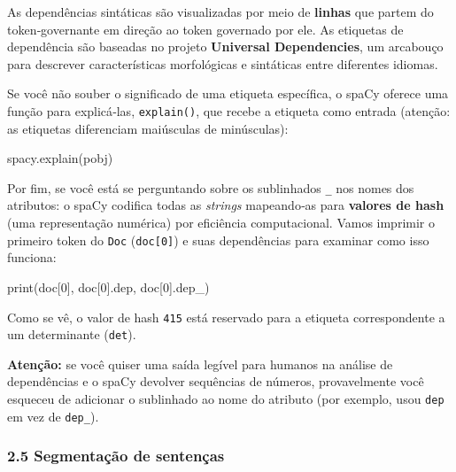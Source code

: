 \documentclass[
  brazilian,
  11pt,
]{article}
\newenvironment{Shaded}{\begin{snugshade}}{\end{snugshade}}
\newcommand{\BuiltInTok}[1]{\textcolor[rgb]{0.50,0.55,0.55}{#1}}
\newcommand{\DecValTok}[1]{\textcolor[rgb]{0.96,0.45,0.00}{#1}}
\newcommand{\NormalTok}[1]{\textcolor[rgb]{0.81,0.81,0.76}{#1}}
\newcommand{\StringTok}[1]{\textcolor[rgb]{0.96,0.31,0.31}{#1}}
\let\oldtexttt\texttt
\renewcommand{\texttt}[1]{{\color{inlink}\oldtexttt{#1}}}
\begin{document}
As dependências sintáticas são visualizadas por meio de \textbf{linhas}
que partem do token‑governante em direção ao token governado por ele. As
etiquetas de dependência são baseadas no projeto \textbf{Universal
Dependencies}, um arcabouço para descrever características morfológicas
e sintáticas entre diferentes idiomas.

Se você não souber o significado de uma etiqueta específica, o spaCy
oferece uma função para explicá‑las, \texttt{explain()}, que recebe a
etiqueta como entrada (atenção: as etiquetas diferenciam maiúsculas de
minúsculas):

\begin{Shaded}
\begin{Highlighting}[]
\NormalTok{spacy.explain(}\StringTok{\textquotesingle{}pobj\textquotesingle{}}\NormalTok{)}
\end{Highlighting}
\end{Shaded}

Por fim, se você está se perguntando sobre os sublinhados \texttt{\_}
nos nomes dos atributos: o spaCy codifica todas as \emph{strings}
mapeando‑as para \textbf{valores de hash} (uma representação numérica)
por eficiência computacional. Vamos imprimir o primeiro token do
\texttt{Doc} (\texttt{doc{[}0{]}}) e suas dependências para examinar
como isso funciona:

\begin{Shaded}
\begin{Highlighting}[]
\BuiltInTok{print}\NormalTok{(doc[}\DecValTok{0}\NormalTok{], doc[}\DecValTok{0}\NormalTok{].dep, doc[}\DecValTok{0}\NormalTok{].dep\_)}
\end{Highlighting}
\end{Shaded}

Como se vê, o valor de hash \texttt{415} está reservado para a etiqueta
correspondente a um determinante (\texttt{det}).

\begin{warnbox}

\textbf{Atenção:} se você quiser uma saída legível para humanos na
análise de dependências e o spaCy devolver sequências de números,
provavelmente você esqueceu de adicionar o sublinhado ao nome do
atributo (por exemplo, usou \texttt{dep} em vez de \texttt{dep\_}).

\end{warnbox}

\subsubsection{2.5 Segmentação de
sentenças}\label{segmentauxe7uxe3o-de-sentenuxe7as}
\end{document}

